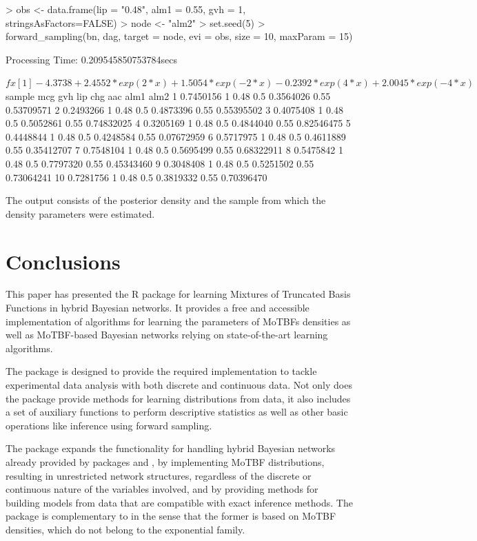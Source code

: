 \begin{example}
> obs <- data.frame(lip = "0.48", alm1 = 0.55, gvh = 1, stringsAsFactors=FALSE)
> node <- "alm2"
> set.seed(5)
> forward_sampling(bn, dag, target = node, evi = obs, size = 10, maxParam = 15)

Processing Time: 0.209545850753784secs

$fx
[1] -4.3738+2.4552*exp(2*x)+1.5054*exp(-2*x)-0.2392*exp(4*x)+2.0045*exp(-4*x)

$sample
mcg gvh  lip chg       aac alm1       alm2
1  0.7450156   1 0.48 0.5 0.3564026 0.55 0.53709571
2  0.2493266   1 0.48 0.5 0.4873396 0.55 0.55395502
3  0.4075408   1 0.48 0.5 0.5052861 0.55 0.74832025
4  0.3205169   1 0.48 0.5 0.4844040 0.55 0.82546475
5  0.4448844   1 0.48 0.5 0.4248584 0.55 0.07672959
6  0.5717975   1 0.48 0.5 0.4611889 0.55 0.35412707
7  0.7548104   1 0.48 0.5 0.5695499 0.55 0.68322911
8  0.5475842   1 0.48 0.5 0.7797320 0.55 0.45343460
9  0.3048408   1 0.48 0.5 0.5251502 0.55 0.73064241
10 0.7281756   1 0.48 0.5 0.3819332 0.55 0.70396470

\end{example}
		
The output consists of the posterior density and the sample from which the density parameters were estimated.
						
						

\section{Conclusions}
\label{sec:conclusions}
This paper has presented the R package  for learning Mixtures of Truncated Basis Functions in hybrid Bayesian networks.
It provides a free and accessible implementation of algorithms for learning the parameters of MoTBFs densities as
well as MoTBF-based Bayesian networks relying on state-of-the-art learning algorithms.

The  package is designed to provide the required implementation to tackle experimental data analysis 
with both discrete and continuous data. Not only does the package provide methods for learning distributions from data, 
it also includes a set of auxiliary functions to perform descriptive statistics 
as well as other basic operations like inference using forward sampling.

The  package expands the functionality for handling hybrid Bayesian networks already provided by 
packages  and , by implementing MoTBF distributions, resulting in unrestricted
network structures, regardless of the discrete or continuous nature of the variables involved, and by providing 
methods for building models from data that are compatible with exact inference methods. The package
 is complementary to  in the sense that the former is based on MoTBF densities, which 
do not belong to the exponential family.

